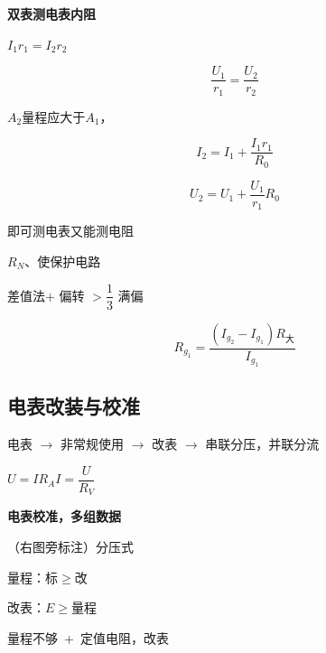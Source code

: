 \textbf{双表测电表内阻}


$I_1r_1=I_2r_2$


\[\frac{U_1}{r_1}=\frac{U_2}{r_2}\]


$A_2$量程应大于$A_1$，

\[I_2=I_1+\frac{I_1r_1}{R_0}\]


\[U_2=U_1+\frac{U_1}{r_1}R_0\]

即可测电表又能测电阻 %



$R_N$、使保护电路

差值法\quad $+$ 偏转 $>\dfrac{1}{3}$ 满偏

\[
R_{g_1}=\frac{(I_{g_2}-I_{g_1})R_{\text{大}}}{I_{g_1}}
\]

\subsection{电表改装与校准}
电表 $\to$ 非常规使用 $\to$ 改表 $\to$ 串联分压，并联分流

$U=IR_A$\quad $I=\dfrac{U}{R_V}$

\textbf{电表校准，多组数据}


（右图旁标注）分压式

量程：标$\ge$改

改表：$E\ge$量程

量程不够\ +\ 定值电阻，改表

